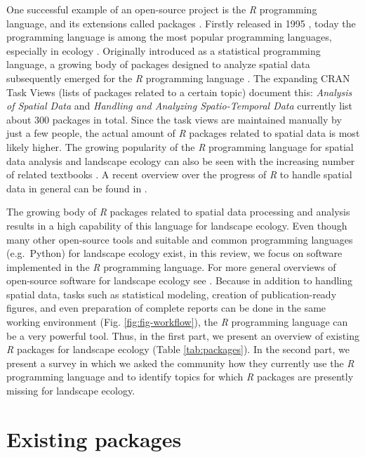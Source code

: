 \documentclass[smallextended]{svjour3}       %
\begin{document}
One successful example of an open-source project is the \emph{R} programming language, and its extensions called packages \cite{RCoreTeam2019}.
Firstly released in 1995 \cite{Smith2016}, today the programming language is among the most popular programming languages, especially in ecology \cite{Lai2019}.
Originally introduced as a statistical programming language, a growing body of packages designed to analyze spatial data subsequently emerged for the \emph{R} programming language \cite{Bivand2006,Lovelace2019}.
The expanding CRAN Task Views (lists of packages related to a certain topic) document this: \emph{Analysis of Spatial Data} \cite{Bivand2019a} and \emph{Handling and Analyzing Spatio-Temporal Data} \cite{Pebesma2020} currently list about 300 packages in total.
Since the task views are maintained manually by just a few people, the actual amount of \emph{R} packages related to spatial data is most likely higher.
The growing popularity of the \emph{R} programming language for spatial data analysis and landscape ecology can also be seen with the increasing number of related textbooks \cite{Wegmann2016,Fletcher2019,Lovelace2019,Pebesma2019a}.
A recent overview over the progress of \emph{R} to handle spatial data in general can be found in \cite{Bivand2020}.

The growing body of \emph{R} packages related to spatial data processing and analysis results in a high capability of this language for landscape ecology.
Even though many other open-source tools \cite{QGISDevelopmentTeam2016,GRASSDevelopmentTeam2017,Porta2017} and suitable and common programming languages (e.g.~Python) for landscape ecology exist, in this review, we focus on software implemented in the \emph{R} programming language.
For more general overviews of open-source software for landscape ecology see \cite{Jolma2008,Steiniger2009,Steiniger2009a,Istvan2012}.
Because in addition to handling spatial data, tasks such as statistical modeling, creation of publication-ready figures, and even preparation of complete reports can be done in the same working environment (Fig. \ref{fig:fig-workflow}), the \emph{R} programming language can be a very powerful tool.
Thus, in the first part, we present an overview of existing \emph{R} packages for landscape ecology (Table \ref{tab:packages}).
In the second part, we present a survey in which we asked the community how they currently use the \emph{R} programming language and to identify topics for which \emph{R} packages are presently missing for landscape ecology.

\hypertarget{sec:existing_packages}{%
\section{Existing packages}\label{sec:existing_packages}}
\end{document}
